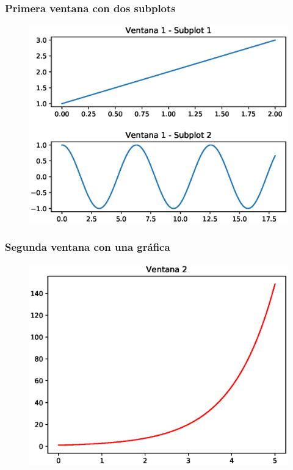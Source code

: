 \begin{frame}[fragile]
\frametitle{Primera ventana con dos subplots}
\begin{figure}
	\centering
    \includegraphics[scale=0.6]{Imagenes/plotEjercicio5_1.eps}
\end{figure}
\end{frame}
\begin{frame}[fragile]
\frametitle{Segunda ventana con una gráfica}
\begin{figure}
    \centering
    \includegraphics[scale=0.6]{Imagenes/plotEjercicio5_2.eps}
\end{figure}
\end{frame}
